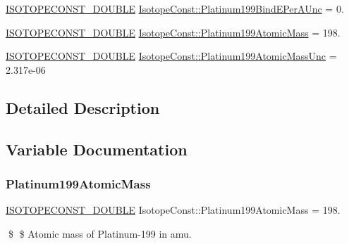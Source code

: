 \begin{DoxyCompactItemize}
\mbox{\hyperlink{group___isotope_const-_macros_ga8f45a7272ce02c0b4c65c44636ed719a}{I\+S\+O\+T\+O\+P\+E\+C\+O\+N\+S\+T\+\_\+\+D\+O\+U\+B\+LE}} \mbox{\hyperlink{group___isotope_const-_platinum-_pt199_gaddf746cc08a88dfd3f6f8cb3e5d19684}{Isotope\+Const\+::\+Platinum199\+Bind\+E\+Per\+A\+Unc}} = 0.
\item 
\mbox{\hyperlink{group___isotope_const-_macros_ga8f45a7272ce02c0b4c65c44636ed719a}{I\+S\+O\+T\+O\+P\+E\+C\+O\+N\+S\+T\+\_\+\+D\+O\+U\+B\+LE}} \mbox{\hyperlink{group___isotope_const-_platinum-_pt199_ga33ccd19c25bcf06e5b46b6a389ef86c6}{Isotope\+Const\+::\+Platinum199\+Atomic\+Mass}} = 198.
\item 
\mbox{\hyperlink{group___isotope_const-_macros_ga8f45a7272ce02c0b4c65c44636ed719a}{I\+S\+O\+T\+O\+P\+E\+C\+O\+N\+S\+T\+\_\+\+D\+O\+U\+B\+LE}} \mbox{\hyperlink{group___isotope_const-_platinum-_pt199_gaf4ef372be842e08baaedbdcd86022962}{Isotope\+Const\+::\+Platinum199\+Atomic\+Mass\+Unc}} = 2.\+317e-\/06
\end{DoxyCompactItemize}


\subsection{Detailed Description}


\subsection{Variable Documentation}
\mbox{\label{group___isotope_const-_platinum-_pt199_ga33ccd19c25bcf06e5b46b6a389ef86c6}} 
\subsubsection{\texorpdfstring{Platinum199\+Atomic\+Mass}{Platinum199AtomicMass}}
{\footnotesize\ttfamily \mbox{\hyperlink{group___isotope_const-_macros_ga8f45a7272ce02c0b4c65c44636ed719a}{I\+S\+O\+T\+O\+P\+E\+C\+O\+N\+S\+T\+\_\+\+D\+O\+U\+B\+LE}} Isotope\+Const\+::\+Platinum199\+Atomic\+Mass = 198.}

\$ \$ Atomic mass of Platinum-\/199 in amu. \mbox{\label{group___isotope_const-_platinum-_pt199_gaf4ef372be842e08baaedbdcd86022962}} 
